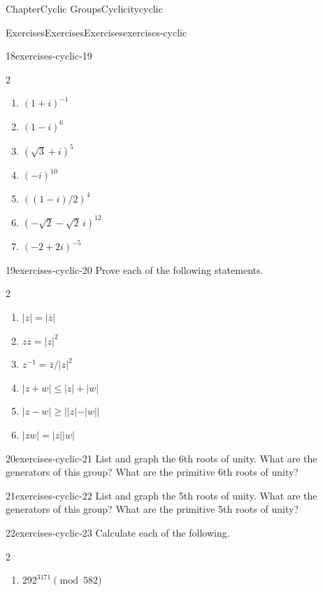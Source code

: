 \documentclass[oneside,10pt,]{book}
\numberwithin{equation}{section}
\begin{document}
\begin{chapterptx}{Chapter}{Cyclic Groups}{}{Cyclicity}{}{}{cyclic}
\begin{exercises-section}{Exercises}{Exercises}{}{Exercises}{}{}{exercises-cyclic}
\begin{divisionexercise}{18}{}{}{exercises-cyclic-19}
\begin{multicols}{2}
\begin{enumerate}[label={(\alph*)}]
\item{}\(\displaystyle (1+i)^{-1}\)%
\item{}\(\displaystyle (1 - i)^{6}\)%
\item{}\(\displaystyle (\sqrt{3} + i)^{5}\)%
\item{}\(\displaystyle (-i)^{10}\)%
\item{}\(\displaystyle ((1-i)/2)^{4}\)%
\item{}\(\displaystyle (-\sqrt{2} - \sqrt{2}\, i)^{12}\)%
\item{}\(\displaystyle (-2 + 2i)^{-5}\)%
\end{enumerate}
\end{multicols}
\end{divisionexercise}%
\begin{divisionexercise}{19}{}{}{exercises-cyclic-20}%
Prove each of the following statements.%
%
\begin{multicols}{2}
\begin{enumerate}[label={(\alph*)}]
\item{}\(\displaystyle |z| = | \overline{z}|\)%
\item{}\(\displaystyle z \overline{z} = |z|^2\)%
\item{}\(\displaystyle z^{-1} = \overline{z} / |z|^2\)%
\item{}\(\displaystyle |z +w| \leq |z| + |w|\)%
\item{}\(\displaystyle |z - w| \geq | |z| - |w||\)%
\item{}\(\displaystyle |z w| = |z|  |w|\)%
\end{enumerate}
\end{multicols}
\end{divisionexercise}%
\begin{divisionexercise}{20}{}{}{exercises-cyclic-21}%
List and graph the 6th roots of unity. What are the generators of this group?  What are the primitive 6th roots of unity?%
\end{divisionexercise}%
\begin{divisionexercise}{21}{}{}{exercises-cyclic-22}%
List and graph the 5th roots of unity. What are the generators of this group?  What are the primitive 5th roots of unity?%
\end{divisionexercise}%
\begin{divisionexercise}{22}{}{}{exercises-cyclic-23}%
Calculate each of the following.%
%
\begin{multicols}{2}
\begin{enumerate}[label={(\alph*)}]
\item{}\(\displaystyle 292^{3171} \pmod{ 582}\)%

\end{enumerate}
\end{multicols}
\end{divisionexercise}
\end{exercises-section}
\end{chapterptx}
\end{document}
